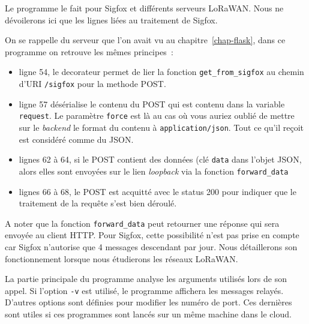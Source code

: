     \vspace{1em}

 Le programme  le fait pour Sigfox et différents serveurs LoRaWAN. Nous ne dévoilerons ici que les lignes liées au traitement de Sigfox.
 
 
 
 On se rappelle du serveur  que l'on avait vu au chapitre~\vref{chap-flask}, dans ce programme on retrouve les mêmes principes~:
 
 \begin{itemize}
     \item ligne 54, le decorateur permet de lier la fonction \texttt{get\_from\_sigfox} au chemin d'URI \texttt{/sigfox} pour la methode POST.
     \item ligne 57 désérialise le contenu du POST qui est contenu dans la variable \texttt{request}. Le paramètre \texttt{force} est là au cas où vous auriez oublié de mettre sur le \textit{backend} le format du contenu à \texttt{application/json}. Tout ce qu'il reçoit est considéré comme du JSON.
     \item lignes 62 à 64, si le POST contient des données (clé \texttt{data} dans l'objet JSON, alors elles sont envoyées sur le lien \textit{loopback} via la fonction \texttt{forward\_data}
     \item lignes 66 à 68, le POST est acquitté avec le status 200 pour indiquer que le traitement de la requête s'est bien déroulé.
 \end{itemize}
 
      \vspace{1em}

 A noter que la fonction \texttt{forward\_data} peut retourner une réponse qui sera envoyée au client HTTP. Pour Sigfox, cette possibilité n'est pas prise en compte car Sigfox n'autorise que 4 messages descendant par jour. Nous détaillerons son fonctionnement lorsque nous étudierons les réseaux LoRaWAN.
 
 
 La partie principale du programme analyse les arguments utilisés lors de son appel. Si l'option \texttt{-v} est utilisé, le programme affichera les messages relayés. D'autres options sont définies pour modifier les numéro de port. Ces dernières sont utiles si ces programmes sont lancés sur un même machine dans le cloud.
 
